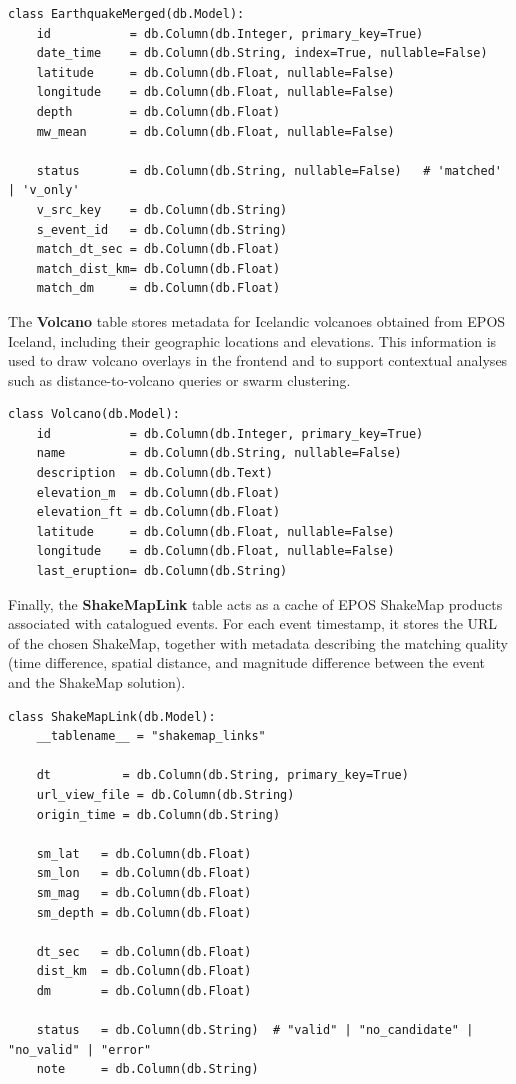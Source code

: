 \documentclass[12pt]{article}
\begin{document}
\begin{verbatim}
class EarthquakeMerged(db.Model):
    id           = db.Column(db.Integer, primary_key=True)
    date_time    = db.Column(db.String, index=True, nullable=False)
    latitude     = db.Column(db.Float, nullable=False)
    longitude    = db.Column(db.Float, nullable=False)
    depth        = db.Column(db.Float)
    mw_mean      = db.Column(db.Float, nullable=False)

    status       = db.Column(db.String, nullable=False)   # 'matched' | 'v_only'
    v_src_key    = db.Column(db.String)
    s_event_id   = db.Column(db.String)
    match_dt_sec = db.Column(db.Float)
    match_dist_km= db.Column(db.Float)
    match_dm     = db.Column(db.Float)
\end{verbatim}

The \textbf{Volcano} table stores metadata for Icelandic volcanoes obtained from EPOS Iceland, including their geographic locations and elevations. This information is used to draw volcano overlays in the frontend and to support contextual analyses such as distance-to-volcano queries or swarm clustering.

\begin{verbatim}
class Volcano(db.Model):
    id           = db.Column(db.Integer, primary_key=True)
    name         = db.Column(db.String, nullable=False)
    description  = db.Column(db.Text)
    elevation_m  = db.Column(db.Float)
    elevation_ft = db.Column(db.Float)
    latitude     = db.Column(db.Float, nullable=False)
    longitude    = db.Column(db.Float, nullable=False)
    last_eruption= db.Column(db.String)
\end{verbatim}

Finally, the \textbf{ShakeMapLink} table acts as a cache of EPOS ShakeMap products associated with catalogued events. For each event timestamp, it stores the URL of the chosen ShakeMap, together with metadata describing the matching quality (time difference, spatial distance, and magnitude difference between the event and the ShakeMap solution).

\begin{verbatim}
class ShakeMapLink(db.Model):
    __tablename__ = "shakemap_links"

    dt          = db.Column(db.String, primary_key=True)
    url_view_file = db.Column(db.String)
    origin_time = db.Column(db.String)

    sm_lat   = db.Column(db.Float)
    sm_lon   = db.Column(db.Float)
    sm_mag   = db.Column(db.Float)
    sm_depth = db.Column(db.Float)

    dt_sec   = db.Column(db.Float)
    dist_km  = db.Column(db.Float)
    dm       = db.Column(db.Float)

    status   = db.Column(db.String)  # "valid" | "no_candidate" | "no_valid" | "error"
    note     = db.Column(db.String)
\end{verbatim}
\end{document}
